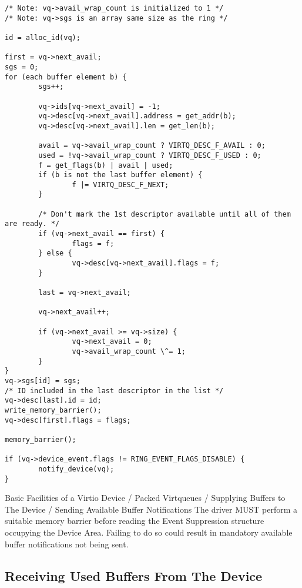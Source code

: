 \begin{lstlisting}
/* Note: vq->avail_wrap_count is initialized to 1 */
/* Note: vq->sgs is an array same size as the ring */

id = alloc_id(vq);

first = vq->next_avail;
sgs = 0;
for (each buffer element b) {
        sgs++;

        vq->ids[vq->next_avail] = -1;
        vq->desc[vq->next_avail].address = get_addr(b);
        vq->desc[vq->next_avail].len = get_len(b);

        avail = vq->avail_wrap_count ? VIRTQ_DESC_F_AVAIL : 0;
        used = !vq->avail_wrap_count ? VIRTQ_DESC_F_USED : 0;
        f = get_flags(b) | avail | used;
        if (b is not the last buffer element) {
                f |= VIRTQ_DESC_F_NEXT;
        }

        /* Don't mark the 1st descriptor available until all of them are ready. */
        if (vq->next_avail == first) {
                flags = f;
        } else {
                vq->desc[vq->next_avail].flags = f;
        }

        last = vq->next_avail;

        vq->next_avail++;

        if (vq->next_avail >= vq->size) {
                vq->next_avail = 0;
                vq->avail_wrap_count \^= 1;
        }
}
vq->sgs[id] = sgs;
/* ID included in the last descriptor in the list */
vq->desc[last].id = id;
write_memory_barrier();
vq->desc[first].flags = flags;

memory_barrier();

if (vq->device_event.flags != RING_EVENT_FLAGS_DISABLE) {
        notify_device(vq);
}

\end{lstlisting}


 {Basic Facilities of a Virtio Device / Packed Virtqueues / Supplying Buffers to The Device / Sending Available Buffer Notifications}
The driver MUST perform a suitable memory barrier before reading
the Event Suppression structure occupying the Device Area. Failing
to do so could result in mandatory available buffer notifications
not being sent.

\subsection{Receiving Used Buffers From The Device}\label{sec:Basic Facilities of a Virtio Device / Packed Virtqueues / Receiving Used Buffers From The Device}

